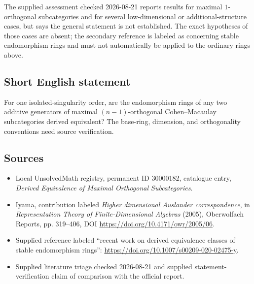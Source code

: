 \documentclass[11pt]{article}
\begin{document}
The supplied assessment checked 2026-08-21 reports results for maximal \(1\)-orthogonal subcategories and for several low-dimensional or additional-structure cases, but says the general statement is not established. The exact hypotheses of those cases are absent; the secondary reference is labeled as concerning stable endomorphism rings and must not automatically be applied to the ordinary rings above.
\subsection{Short English statement}
For one isolated-singularity order, are the endomorphism rings of any two additive generators of maximal \((n-1)\)-orthogonal Cohen--Macaulay subcategories derived equivalent? The base-ring, dimension, and orthogonality conventions need source verification.
\subsection{Sources}
\begin{itemize}
\item Local UnsolvedMath registry, permanent ID 30000182, catalogue entry, \emph{Derived Equivalence of Maximal Orthogonal Subcategories}.
\item Iyama, contribution labeled \emph{Higher dimensional Auslander correspondence}, in \emph{Representation Theory of Finite-Dimensional Algebras} (2005), Oberwolfach Reports, pp. 319--406, DOI \url{https://doi.org/10.4171/owr/2005/06}.
\item Supplied reference labeled ``recent work on derived equivalence classes of stable endomorphism rings'': \url{https://doi.org/10.1007/s00209-020-02475-y}.
\item Supplied literature triage checked 2026-08-21 and supplied statement-verification claim of comparison with the official report.
\end{itemize}
\end{document}
